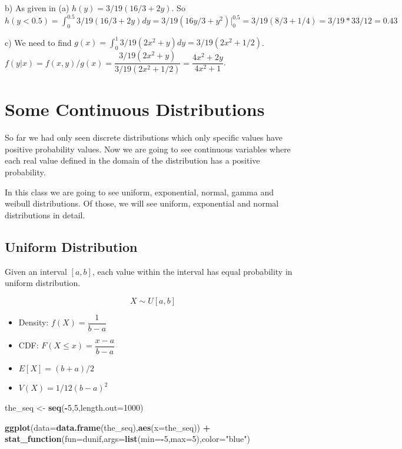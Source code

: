 \documentclass[]{book}
\newenvironment{Shaded}{\begin{snugshade}}{\end{snugshade}}
\newcommand{\DataTypeTok}[1]{\textcolor[rgb]{0.13,0.29,0.53}{#1}}
\newcommand{\DecValTok}[1]{\textcolor[rgb]{0.00,0.00,0.81}{#1}}
\newcommand{\KeywordTok}[1]{\textcolor[rgb]{0.13,0.29,0.53}{\textbf{#1}}}
\newcommand{\NormalTok}[1]{#1}
\newcommand{\OperatorTok}[1]{\textcolor[rgb]{0.81,0.36,0.00}{\textbf{#1}}}
\newcommand{\StringTok}[1]{\textcolor[rgb]{0.31,0.60,0.02}{#1}}
\theoremstyle{definition}
\theoremstyle{definition}
\theoremstyle{definition}
\theoremstyle{remark}
\begin{document}
b) As given in (a) \(h(y) = 3/19(16/3+2y)\). So
\(h(y<0.5) = \int^{0.5}_0 3/19(16/3+2y) dy = 3/19(16y/3+y^2)|^{0.5}_0 = 3/19(8/3 + 1/4) = 3/19*33/12 = 0.43\)

c) We need to find
\(g(x) = \int^1_0 3/19(2x^2 + y)dy = 3/19(2x^2 + 1/2)\).
\(f(y|x) = f(x,y)/g(x) = \dfrac{3/19(2x^2+y)}{3/19(2x^2 + 1/2)} = \dfrac{4x^2 + 2y}{4x^2 + 1}\).

\hypertarget{some-continuous-distributions}{%
\chapter{Some Continuous
Distributions}\label{some-continuous-distributions}}

So far we had only seen discrete distributions which only specific
values have positive probability values. Now we are going to see
continuous variables where each real value defined in the domain of the
distribution has a positive probability.

In this class we are going to see uniform, exponential, normal, gamma
and weibull distributions. Of those, we will see uniform, exponential
and normal distributions in detail.

\hypertarget{uniform-distribution}{%
\section{Uniform Distribution}\label{uniform-distribution}}

Given an interval \([a,b]\), each value within the interval has equal
probability in uniform distribution.

\[X \sim U[a,b]\]

\begin{itemize}
\item
  Density: \(f(X) = \dfrac{1}{b-a}\)
\item
  CDF: \(F(X \le x) = \dfrac{x-a}{b-a}\)
\item
  \(E[X] = (b+a)/2\)
\item
  \(V(X) = 1/12(b-a)^2\)
\end{itemize}

\begin{Shaded}
\begin{Highlighting}[]
\NormalTok{the_seq <-}\StringTok{ }\KeywordTok{seq}\NormalTok{(}\OperatorTok{-}\DecValTok{5}\NormalTok{,}\DecValTok{5}\NormalTok{,}\DataTypeTok{length.out=}\DecValTok{1000}\NormalTok{)}

\KeywordTok{ggplot}\NormalTok{(}\DataTypeTok{data=}\KeywordTok{data.frame}\NormalTok{(the_seq),}\KeywordTok{aes}\NormalTok{(}\DataTypeTok{x=}\NormalTok{the_seq)) }\OperatorTok{+}
\StringTok{    }\KeywordTok{stat_function}\NormalTok{(}\DataTypeTok{fun=}\NormalTok{dunif,}\DataTypeTok{args=}\KeywordTok{list}\NormalTok{(}\DataTypeTok{min=}\OperatorTok{-}\DecValTok{5}\NormalTok{,}\DataTypeTok{max=}\DecValTok{5}\NormalTok{),}\DataTypeTok{color=}\StringTok{"blue"}\NormalTok{)}
\end{Highlighting}
\end{Shaded}
\end{document}
